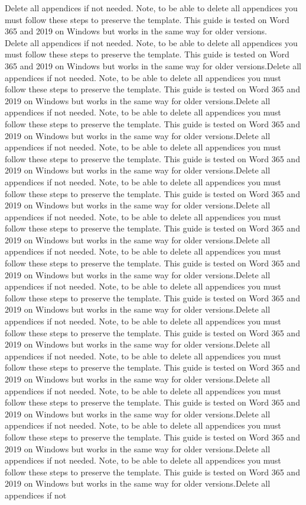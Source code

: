 Delete all appendices if not needed. Note, to be able to delete all appendices you must follow these steps to preserve the template. This guide is tested on Word 365 and 2019 on Windows but works in the same way for older versions.\\Delete all appendices if not needed. Note, to be able to delete all appendices you must follow these steps to preserve the template. This guide is tested on Word 365 and 2019 on Windows but works in the same way for older versions.Delete all appendices if not needed. Note, to be able to delete all appendices you must follow these steps to preserve the template. This guide is tested on Word 365 and 2019 on Windows but works in the same way for older versions.Delete all appendices if not needed. Note, to be able to delete all appendices you must follow these steps to preserve the template. This guide is tested on Word 365 and 2019 on Windows but works in the same way for older versions.Delete all appendices if not needed. Note, to be able to delete all appendices you must follow these steps to preserve the template. This guide is tested on Word 365 and 2019 on Windows but works in the same way for older versions.Delete all appendices if not needed. Note, to be able to delete all appendices you must follow these steps to preserve the template. This guide is tested on Word 365 and 2019 on Windows but works in the same way for older versions.Delete all appendices if not needed. Note, to be able to delete all appendices you must follow these steps to preserve the template. This guide is tested on Word 365 and 2019 on Windows but works in the same way for older versions.Delete all appendices if not needed. Note, to be able to delete all appendices you must follow these steps to preserve the template. This guide is tested on Word 365 and 2019 on Windows but works in the same way for older versions.Delete all appendices if not needed. Note, to be able to delete all appendices you must follow these steps to preserve the template. This guide is tested on Word 365 and 2019 on Windows but works in the same way for older versions.Delete all appendices if not needed. Note, to be able to delete all appendices you must follow these steps to preserve the template. This guide is tested on Word 365 and 2019 on Windows but works in the same way for older versions.Delete all appendices if not needed. Note, to be able to delete all appendices you must follow these steps to preserve the template. This guide is tested on Word 365 and 2019 on Windows but works in the same way for older versions.Delete all appendices if not needed. Note, to be able to delete all appendices you must follow these steps to preserve the template. This guide is tested on Word 365 and 2019 on Windows but works in the same way for older versions.Delete all appendices if not needed. Note, to be able to delete all appendices you must follow these steps to preserve the template. This guide is tested on Word 365 and 2019 on Windows but works in the same way for older versions.Delete all appendices if not needed. Note, to be able to delete all appendices you must follow these steps to preserve the template. This guide is tested on Word 365 and 2019 on Windows but works in the same way for older versions.Delete all appendices if not 